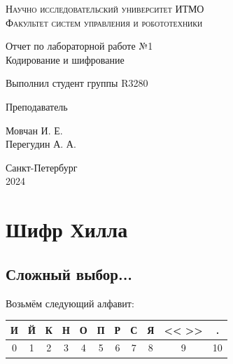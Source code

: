 \documentclass[a4paper,hidelinks,14pt]{extarticle}
\begin{document}
	\begin{titlepage}
		\setlength{\parindent}{0ex}
		
		\begin{center}
			\textsc{
				\vspace{1ex}
				Научно исследовательский университет ИТМО \\
				\vspace{0.5ex}
				Факультет систем управления и робототехники \\
				\vspace{0.5ex}
			}
		\end{center}
		
		\vspace{50mm}
		
		\begin{center}
			Отчет по лабораторной работе №1 \\
			Кодирование и шифрование
		\end{center}
		
		\vspace{50mm}
		
		\begin{minipage}{.55\linewidth}
			Выполнил студент группы R3280
			
			\smallskip
			
			Преподаватель
		\end{minipage}
		\hfill
		\begin{minipage}{.4\linewidth}
			\begin{flushright}
				Мовчан И. Е.
				\\
				Перегудин А. А.
			\end{flushright}
		\end{minipage}
		
		\vfill
		\begin{center}
			Санкт-Петербург
			\\
			2024
		\end{center}
		
	\end{titlepage}
	
	\section{Шифр Хилла}
	\subsection{Сложный выбор...}
	Возьмём следующий алфавит:
	\begin{table}[h]
		\centering
		\begin{tabular}{|c|c|c|c|c|c|c|c|c|c|c|}
			\hline
			И & Й & К & Н & О & П & Р & С & Я & << >> & . \\
			\hline
			0 & 1 & 2 & 3 & 4 & 5 & 6 & 7 & 8 & 9 & 10 \\
			\hline
		\end{tabular}
	\end{table}
	
\end{document}
